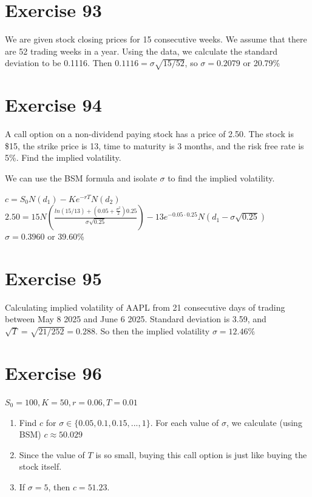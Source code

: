 \documentclass{article}
\begin{document}
\section*{Exercise 93}
We are given stock closing prices for 15 consecutive weeks. We assume that there are 52 trading weeks in a year. Using the data,
we calculate the standard deviation to be 0.1116. Then $0.1116 = \sigma \sqrt{15/52}$, so $\sigma = 0.2079$ or 20.79\%

\section*{Exercise 94}
A call option on a non-dividend paying stock has a price of 2.50. The stock is \$15, the strike price is 13, time to maturity is 3 months, and the risk free rate is 5\%. Find the implied volatility.
\begin{flushleft}
    We can use the BSM formula and isolate $\sigma$ to find the implied volatility.
    \begin{center}
        $c = S_0N(d_1) - Ke^{-rT}N(d_2)$ \\
        $2.50 = 15N(\frac{ln(15/13) + (0.05 + \frac{\sigma^2}{2})0.25}{\sigma \sqrt{0.25}}) - 13e^{-0.05 \cdot 0.25}N(d_1 - \sigma \sqrt{0.25})$ \\
        $\sigma = 0.3960$ or 39.60\%
    \end{center}
\end{flushleft}

\section*{Exercise 95}
Calculating implied volatility of AAPL from 21 consecutive days of trading between May 8 2025 and June 6 2025.
Standard deviation is 3.59, and $\sqrt{T} = \sqrt{21/252} = 0.288$. So then the implied volatility $\sigma = 12.46\%$

\section*{Exercise 96}
$S_0 = 100, K=50, r = 0.06, T=0.01$
\begin{flushleft}
    \begin{enumerate}
        \item Find $c$ for $\sigma \in \{ 0.05, 0.1, 0.15, ... , 1 \}$. For each value of $\sigma$, we calculate (using BSM) $c \approx 50.029$
        \item Since the value of $T$ is so small, buying this call option is just like buying the stock itself.
        \item If $\sigma = 5$, then $c = 51.23$.
    \end{enumerate}
\end{flushleft}
\end{document}
